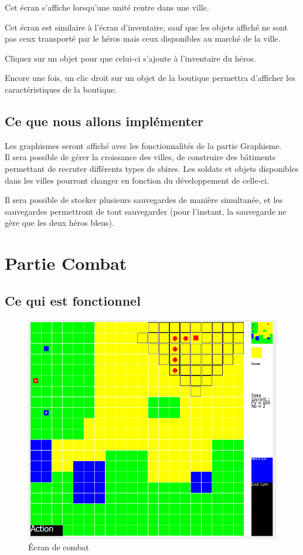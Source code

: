 \documentclass[11pt,a4paper]{article}
\begin{document}
Cet écran s'affiche lorsqu'une unité rentre dans une ville.

Cet écran est similaire à l'écran d'inventaire, sauf que les objets affiché ne sont pas ceux transporté par le héros mais ceux disponibles au marché de la ville.

Cliquez sur un objet pour que celui-ci s'ajoute à l'inventaire du héros.

Encore une fois, un clic droit sur un objet de la boutique permettra d'afficher les caractéristiques de la boutique.

\subsection{Ce que nous allons implémenter}

Les graphismes seront affiché avec les fonctionnalités de la partie Graphisme. \\
Il sera possible de gérer la croissance des villes, de construire des bâtiments permettant de recruter différents types de sbires. Les soldats et objets disponibles dans les villes pourront changer en fonction du développement de celle-ci.

Il sera possible de stocker plusieurs sauvegardes de manière simultanée, et les sauvegardes permettront de tout sauvegarder (pour l'instant, la sauvegarde ne gère que les deux héros bleus).


\section{Partie Combat}

\subsection{Ce qui est fonctionnel}

\begin{figure}[h]
\begin{center}
\includegraphics[scale=0.5]{./ecran_de_combat.png}
\caption{Écran de combat}
\end{center}
\end{figure}
\end{document}
